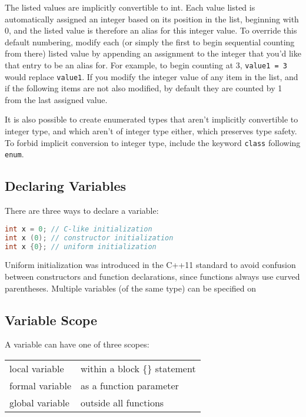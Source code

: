 \documentclass[10pt]{article}
\begin{document}
The listed values are implicitly convertible to int. Each value listed is automatically assigned an integer based on its position in the list, beginning with 0, and the listed value is therefore an alias for this integer value. To override this default numbering, modify each (or simply the first to begin sequential counting from there) listed value by appending an assignment to the integer that you'd like that entry to be an alias for. For example, to begin counting at 3, \texttt{value1 = 3} would replace \texttt{value1}. If you modify the integer value of any item in the list, and if the following items are not also modified, by default they are counted by 1 from the last assigned value.

It is also possible to create enumerated types that aren't implicitly convertible to integer type, and which aren't of integer type either, which preserves type safety. To forbid implicit conversion to integer type, include the keyword \texttt{class} following \texttt{enum}.

\subsection{Declaring Variables}

There are three ways to declare a variable:

\begin{lstlisting}[language=C++]
int x = 0; // C-like initialization
int x (0); // constructor initialization
int x {0}; // uniform initialization
\end{lstlisting}

Uniform initialization was introduced in the C++11 standard to avoid confusion between constructors and function declarations, since functions always use curved parentheses. Multiple variables (of the same type) can be specified on 

\subsection{Variable Scope}

A variable can have one of three scopes:

\begin{center}
\begin{tabular}{l l}
local variable & within a block \{\} statement\\
formal variable & as a function parameter\\
global variable & outside all functions\\
\end{tabular}
\end{center}
\end{document}
